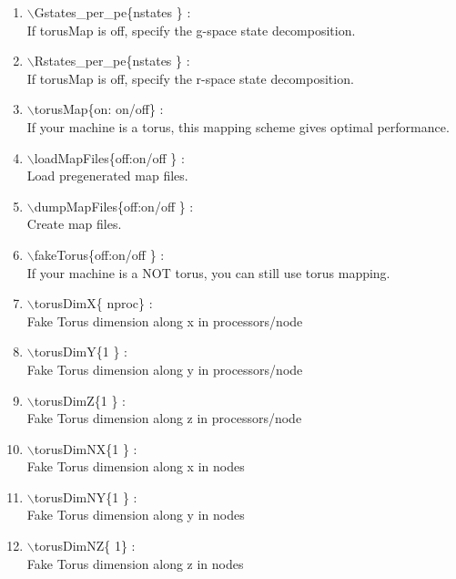 \documentclass[12pt,titlepage]{article}
\begin{document}
\begin{enumerate}
  \vspace{0.15in} 
  \item $\backslash$Gstates\_per\_pe\{nstates \} : \\    
  If torusMap is off, specify the g-space state decomposition.
  \vspace{0.15in} 
  \item $\backslash$Rstates\_per\_pe\{nstates \} : \\    
  If torusMap is off, specify the r-space state decomposition.
  \vspace{0.15in} 
  \item $\backslash$torusMap\{on: on/off\} : \\    
  If your machine is a torus, this mapping scheme gives optimal performance.
  \vspace{0.15in} 
  \item $\backslash$loadMapFiles\{off:on/off \} : \\    
  Load pregenerated map files.
  \vspace{0.15in} 
  \item $\backslash$dumpMapFiles\{off:on/off \} : \\    
  Create map files.
  \vspace{0.15in} 
  \item $\backslash$fakeTorus\{off:on/off \} : \\    
  If your machine is a NOT torus, you can still use torus mapping.
  \vspace{0.15in} 
  \item $\backslash$torusDimX\{ nproc\} : \\    
  Fake Torus dimension along x in processors/node
  \vspace{0.15in} 
  \item $\backslash$torusDimY\{1 \} : \\    
  Fake Torus dimension along y in processors/node
  \vspace{0.15in} 
  \item $\backslash$torusDimZ\{1 \} : \\    
  Fake Torus dimension along z in processors/node
  \vspace{0.15in} 
  \item $\backslash$torusDimNX\{1 \} : \\    
  Fake Torus dimension along x in nodes
  \vspace{0.15in} 
  \item $\backslash$torusDimNY\{1 \} : \\    
  Fake Torus dimension along y in nodes
  \vspace{0.15in} 
  \item $\backslash$torusDimNZ\{ 1\} : \\    
  Fake Torus dimension along z in nodes
\end{enumerate}



\end{document}
